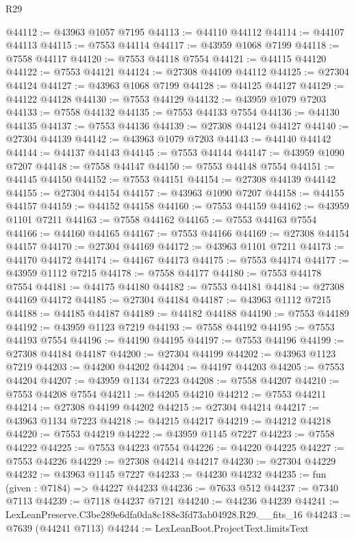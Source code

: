 \begin{lexlean}{R29}
\begin{coremodule}
@44112 := @43963 @1057 @7195
@44113 := @44110 @44112
@44114 := @44107 @44113
@44115 := @7553 @44114
@44117 := @43959 @1068 @7199
@44118 := @7558 @44117
@44120 := @7553 @44118 @7554
@44121 := @44115 @44120
@44122 := @7553 @44121
@44124 := @27308 @44109 @44112
@44125 := @27304 @44124
@44127 := @43963 @1068 @7199
@44128 := @44125 @44127
@44129 := @44122 @44128
@44130 := @7553 @44129
@44132 := @43959 @1079 @7203
@44133 := @7558 @44132
@44135 := @7553 @44133 @7554
@44136 := @44130 @44135
@44137 := @7553 @44136
@44139 := @27308 @44124 @44127
@44140 := @27304 @44139
@44142 := @43963 @1079 @7203
@44143 := @44140 @44142
@44144 := @44137 @44143
@44145 := @7553 @44144
@44147 := @43959 @1090 @7207
@44148 := @7558 @44147
@44150 := @7553 @44148 @7554
@44151 := @44145 @44150
@44152 := @7553 @44151
@44154 := @27308 @44139 @44142
@44155 := @27304 @44154
@44157 := @43963 @1090 @7207
@44158 := @44155 @44157
@44159 := @44152 @44158
@44160 := @7553 @44159
@44162 := @43959 @1101 @7211
@44163 := @7558 @44162
@44165 := @7553 @44163 @7554
@44166 := @44160 @44165
@44167 := @7553 @44166
@44169 := @27308 @44154 @44157
@44170 := @27304 @44169
@44172 := @43963 @1101 @7211
@44173 := @44170 @44172
@44174 := @44167 @44173
@44175 := @7553 @44174
@44177 := @43959 @1112 @7215
@44178 := @7558 @44177
@44180 := @7553 @44178 @7554
@44181 := @44175 @44180
@44182 := @7553 @44181
@44184 := @27308 @44169 @44172
@44185 := @27304 @44184
@44187 := @43963 @1112 @7215
@44188 := @44185 @44187
@44189 := @44182 @44188
@44190 := @7553 @44189
@44192 := @43959 @1123 @7219
@44193 := @7558 @44192
@44195 := @7553 @44193 @7554
@44196 := @44190 @44195
@44197 := @7553 @44196
@44199 := @27308 @44184 @44187
@44200 := @27304 @44199
@44202 := @43963 @1123 @7219
@44203 := @44200 @44202
@44204 := @44197 @44203
@44205 := @7553 @44204
@44207 := @43959 @1134 @7223
@44208 := @7558 @44207
@44210 := @7553 @44208 @7554
@44211 := @44205 @44210
@44212 := @7553 @44211
@44214 := @27308 @44199 @44202
@44215 := @27304 @44214
@44217 := @43963 @1134 @7223
@44218 := @44215 @44217
@44219 := @44212 @44218
@44220 := @7553 @44219
@44222 := @43959 @1145 @7227
@44223 := @7558 @44222
@44225 := @7553 @44223 @7554
@44226 := @44220 @44225
@44227 := @7553 @44226
@44229 := @27308 @44214 @44217
@44230 := @27304 @44229
@44232 := @43963 @1145 @7227
@44233 := @44230 @44232
@44235 := fun (given : @7184) => @44227 @44233
@44236 := @7633 @512
@44237 := @7340 @7113
@44239 := @7118 @44237 @7121
@44240 := @44236 @44239
@44241 := LexLeanPreserve.C3be289e6dfa0da8c188e3fd73ab04928.R29.__fits_16
@44243 := @7639 (@44241 @7113)
@44244 := LexLeanBoot.ProjectText.limitsText

\end{coremodule}
\end{lexlean}

